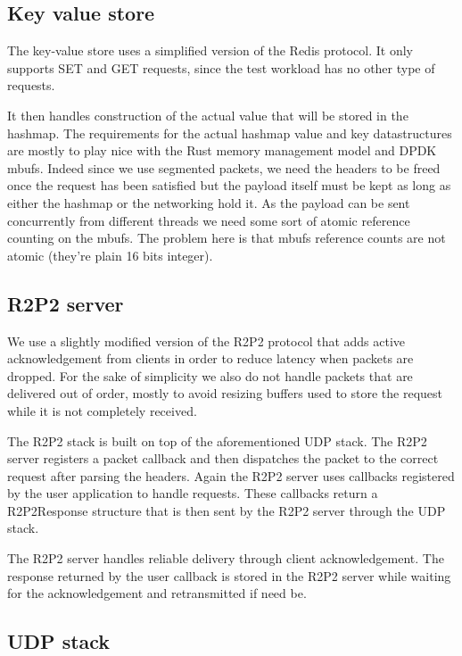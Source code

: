 \subsection{Key value store}

The key-value store uses a simplified version of the Redis
protocol. It only supports SET and GET requests, since the test
workload has no other type of requests.

It then handles construction of the actual value that will be stored
in the hashmap. The requirements for the actual hashmap value and key
datastructures are mostly to play nice with the Rust memory management
model and DPDK mbufs. Indeed since we use segmented packets, we need
the headers to be freed once the request has been satisfied but the
payload itself must be kept as long as either the hashmap or the
networking hold it. As the payload can be sent concurrently from
different threads we need some sort of atomic reference counting on
the mbufs. The problem here is that mbufs reference counts are not
atomic (they're plain 16 bits integer).

\subsection{R2P2 server}

We use a slightly modified version of the R2P2 protocol that adds
active acknowledgement from clients in order to reduce latency when
packets are dropped. For the sake of simplicity we also do not handle
packets that are delivered out of order, mostly to avoid resizing
buffers used to store the request while it is not completely
received.

The R2P2 stack is built on top of the aforementioned UDP stack. The
R2P2 server registers a packet callback and then dispatches the packet
to the correct request after parsing the headers. Again the R2P2
server uses callbacks registered by the user application to handle
requests. These callbacks return a R2P2Response structure that is then
sent by the R2P2 server through the UDP stack.

The R2P2 server handles reliable delivery through client
acknowledgement. The response returned by the user callback is stored
in the R2P2 server while waiting for the acknowledgement and
retransmitted if need be.

\subsection{UDP stack}

